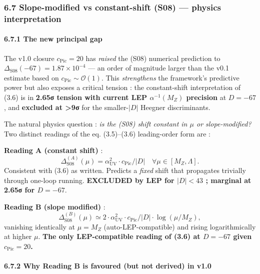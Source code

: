 \documentclass[
  11pt,
  a4paper,
]{article}
\begin{document}
\hypertarget{slope-modified-vs-constant-shift-s08-physics-interpretation}{%
\subsubsection{6.7 Slope-modified vs constant-shift (S08) --- physics interpretation}\label{slope-modified-vs-constant-shift-s08-physics-interpretation}}

\hypertarget{the-new-principal-gap}{%
\paragraph{6.7.1 The new principal gap}\label{the-new-principal-gap}}

The v1.0 closure \(c_{\mathrm{Pic}} = 20\) has \emph{raised} the (S08) numerical prediction to \(\Delta_{\mathrm{S08}}(-67) = 1.87 \times 10^{-4}\) --- an order of magnitude larger than the v0.1 estimate based on \(c_{\mathrm{Pic}} \sim \mathcal O(1)\). This \emph{strengthens} the framework's predictive power but also exposes a critical tension : the constant-shift interpretation of (3.6) is in \textbf{2.65σ tension with current LEP \(\alpha^{-1}(M_Z)\) precision} at \(D = -67\), and \textbf{excluded at \textgreater9σ} for the smaller-\(|D|\) Heegner discriminants.

The natural physics question : \emph{is the (S08) shift constant in \(\mu\) or slope-modified?} Two distinct readings of the eq. (3.5)--(3.6) leading-order form are :

\textbf{Reading A (constant shift)} :
\[
\Delta_{\mathrm{S08}}^{(A)}(\mu) = \alpha_{\mathrm{UV}}^2 \cdot c_{\mathrm{Pic}}/|D| \quad \forall \mu \in [M_Z, \Lambda].
\]
Consistent with (3.6) as written. Predicts a \emph{fixed} shift that propagates trivially through one-loop running. \textbf{EXCLUDED by LEP for \(|D| < 43\) ; marginal at 2.65σ for \(D = -67\)}.

\textbf{Reading B (slope modified)} :
\[
\Delta_{\mathrm{S08}}^{(B)}(\mu) \simeq 2 \cdot \alpha_{\mathrm{UV}}^2 \cdot c_{\mathrm{Pic}}/|D| \cdot \log(\mu/M_Z),
\]
vanishing identically at \(\mu = M_Z\) (auto-LEP-compatible) and rising logarithmically at higher \(\mu\). \textbf{The only LEP-compatible reading of (3.6) at \(D = -67\) given \(c_{\mathrm{Pic}} = 20\).}

\hypertarget{why-reading-b-is-favoured-but-not-derived-in-v1.0}{%
\paragraph{6.7.2 Why Reading B is favoured (but not derived) in v1.0}\label{why-reading-b-is-favoured-but-not-derived-in-v1.0}}
\end{document}
